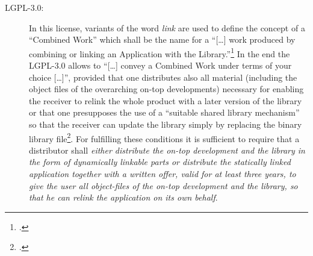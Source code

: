 \begin{description}
  \item[LGPL-3.0:] In this license, variants of the word \emph{link} are used to
  define the concept of a \enquote{Combined Work} which shall be the name for a
  \enquote{[\ldots] work produced by combining or linking an Application with
  the Library.}\footcite [cf.][\nopage wp.\ §0]{Lgpl30OsiLicense2007a} In the
  end the LGPL-3.0 allows to \enquote{[\ldots] convey a Combined Work under
  terms of your choice [\ldots]}, provided that one distributes also all
  material (including the object files of the overarching on-top developments)
  necessary for enabling the receiver to relink the whole product with a
  later version of the library or that one presupposes the use of
  a \enquote{suitable shared library mechanism} so that the receiver can update
  the library simply by replacing the binary library file\footcite[cf.][\nopage
  wp.\ §4]{Lgpl30OsiLicense2007a}. For fulfilling these conditions it is
  sufficient to require that a distributor shall \emph{either distribute the
  on-top development and the library in the form of dynamically linkable parts
  or distribute the statically linked application together with a written offer,
  valid for at least three years, to give the user all object-files of the
  on-top development and the library, so that he can relink the application on
  its own behalf}.


\end{description}
